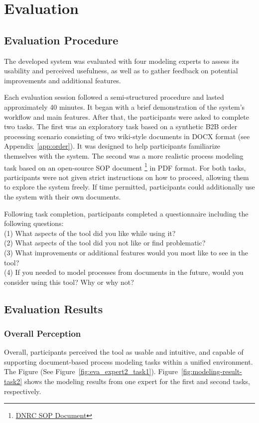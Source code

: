\chapter{Evaluation}
\label{sec:evaluation} 

\section{Evaluation Procedure}
The developed system was evaluated with four modeling experts to assess its usability and perceived usefulness, as well as to gather feedback on potential improvements and additional features.

Each evaluation session followed a semi-structured procedure and lasted approximately 40 minutes. It began with a brief demonstration of the system's workflow and main features. After that, the participants were asked to complete two tasks. The first was an exploratory task based on a synthetic B2B order processing scenario consisting of two wiki-style documents in DOCX format (see Appendix~\ref{app:order}). It was designed to help participants familiarize themselves with the system. The second was a more realistic process modeling task based on an open-source SOP document \footnote{\href{https://dnrc.mt.gov/_docs/forestry/Wildfire/agreements-plans-guides/DNRC-Manuals/300-Fire-Business-Manual/Appendix-300-Manual/2023_Fire_Contract_PMT_SOP.pdf}{DNRC SOP Document}} in PDF format. For both tasks, participants were not given strict instructions on how to proceed, allowing them to explore the system freely. If time permitted, participants could additionally use the system with their own documents. 

Following task completion, participants completed a questionnaire including the following questions: \\
(1) What aspects of the tool did you like while using it? \\
(2) What aspects of the tool did you not like or find problematic? \\
(3) What improvements or additional features would you most like to see in the tool? \\
(4) If you needed to model processes from documents in the future, would you consider using this tool? Why or why not?

\section{Evaluation Results}
\subsection{Overall Perception}
Overall, participants perceived the tool as usable and intuitive, and capable of supporting document-based process modeling tasks within a unified environment. The Figure (See Figure~\ref{fig:eva_expert2_task1}). Figure~\ref{fig:modeling-result-task2} shows the modeling results from one expert for the first and second tasks, respectively. 

